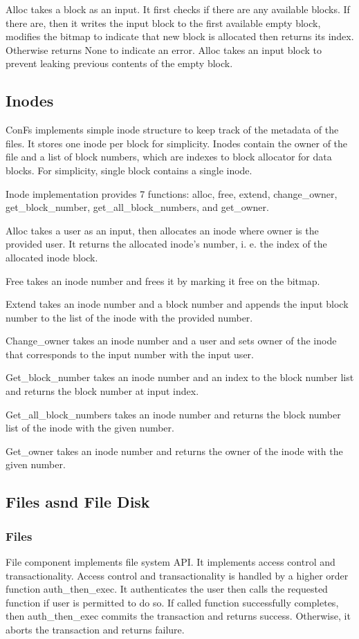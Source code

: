 Alloc takes a block as an input. It first checks if there are any available blocks. If there are, then it writes the input block to the first available empty block, modifies the bitmap to indicate that new block is allocated then returns its index. Otherwise returns None to indicate an error. Alloc takes an input block to prevent leaking previous contents of the empty block.

\subsection{Inodes}
ConFs implements simple inode structure to keep track of the metadata of the files. It stores one inode per block for simplicity. Inodes contain the owner of the file and a list of block numbers, which are indexes to block allocator for data blocks. For simplicity, single block contains a single inode. 

Inode implementation provides 7 functions: alloc, free, extend, change\_owner, get\_block\_number, get\_all\_block\_numbers, and get\_owner.

Alloc takes a user as an input, then allocates an inode where owner is the provided user. It returns the allocated inode's number, i. e. the index of the allocated inode block. 

Free takes an inode number and frees it by marking it free on the bitmap.

Extend takes an inode number and a block number and appends the input block number to the list of the inode with the provided number.

Change\_owner takes an inode number and a user and sets owner of the inode that corresponds to the input number with the input user.

Get\_block\_number takes an inode number and an index to the block number list and returns the block number at input index.

Get\_all\_block\_numbers  takes an inode number and returns the block number list of the inode with the given number.

Get\_owner  takes an inode number and returns the owner of the inode with the given number.

\subsection{Files asnd File Disk}
\subsubsection{Files}
File component implements file system API. It implements access control and transactionality. Access control and transactionality is handled by a higher order function auth\_then\_exec. It authenticates the user then calls the requested function if user is permitted to do so. If called function successfully completes, then auth\_then\_exec commits the transaction and returns success. Otherwise, it aborts the transaction and returns failure.

